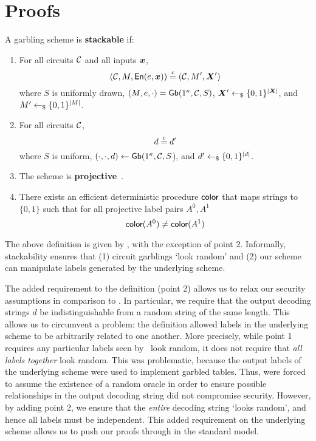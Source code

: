 \section{Proofs}\label{sec:proof}

\begin{definition}[Stackability]\label{def:stackable}
  A garbling scheme is \textbf{stackable} if:
  \begin{enumerate}
    \item
      For
      all circuits $\mathcal C$
      and all inputs $\cirinp$,
      \[
        (\cir, \mat, \gEn(e, \cirinp)) \indist (\cir, \mat', \gcirinp')
      \]
      where
      $S$ is uniformly drawn,
      $(M, e, \cdot) = \textsf{Gb}(1^\kappa, \mathcal C, S)$,
      $\gcirinp' \drawnfrom{} \{0, 1\}^{|\gcirinp|}$,
      and $M' \gets_{\$} \{0, 1\}^{|M|}$.
    \item
      For all circuits $\mathcal C$,
      \[
        d \overset{c}{=} d'
      \]
      where
      $S$ is uniform, $(\cdot, \cdot, d) \gets \textsf{Gb}(1^\kappa, \mathcal C,
      S$),
      and $d' \gets_{\$} \{0, 1\}^{|d|}$.
    \item
      The scheme is \textbf{projective}~\cite{CCS:BelHoaRog12}.
    \item
      There exists an efficient deterministic procedure $\textsf{color}$ that maps strings to $\{0, 1\}$ such that for all projective label pairs $A^0, A^1$
      \[
        \textsf{color}(A^0) \neq \textsf{color}(A^1)
      \]
  \end{enumerate}
\end{definition}

The above definition is given by \HK, with the exception of point 2.
Informally, stackability ensures that (1) circuit garblings `look
random' and (2) our scheme can manipulate labels generated by the
underlying scheme.

The added requirement to the definition (point 2) allows us to relax
our security assumptions in comparison to \HK. In particular, we require that the output decoding
strings $d$ be indistinguishable from a random string of the same
length.  This allows us to circumvent a problem: the \HK definition allowed labels in the underlying
scheme to be arbitrarily related to one another.
More precisely, while point 1 requires any particular labels seen by
\E\ look random, it does not require that \emph{all labels together}
look random.
%
This was problematic, because the output labels of the
underlying scheme were used to implement garbled tables.
%
Thus, \HK were forced to assume the existence of a random oracle in
order to ensure possible relationships in the output decoding string
did not compromise security.
%
However, by adding point 2, we ensure that the \emph{entire} decoding
string `looks random', and hence all labels must be independent.
This added requirement on the underlying scheme allows us to push our
proofs through in the standard model.

